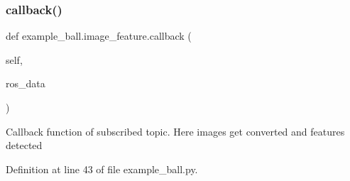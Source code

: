 \mbox{\label{classexample__ball_1_1image__feature_ab9332c62c4aafa56c99505cac8173e84}} 
\subsubsection{\texorpdfstring{callback()}{callback()}\hspace{0.1cm}{\footnotesize\ttfamily [2/3]}}
{\footnotesize\ttfamily def example\+\_\+ball.\+image\+\_\+feature.\+callback (\begin{DoxyParamCaption}\item[{}]{self,  }\item[{}]{ros\+\_\+data }\end{DoxyParamCaption})}

\begin{DoxyVerb}Callback function of subscribed topic. 
Here images get converted and features detected\end{DoxyVerb}
 

Definition at line 43 of file example\+\_\+ball.\+py.


